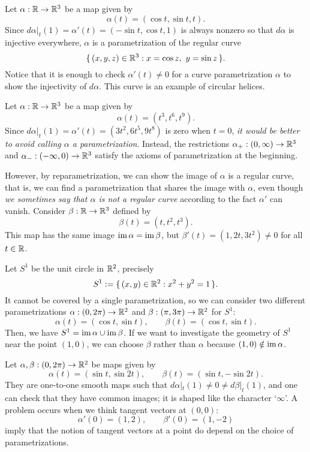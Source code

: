 \documentclass{../../large}
\def\a{\alpha}
\begin{document}
\begin{ex}
\begin{parts}
\item
Let $\a:\R\to\R^3$ be a map given by
\[\a(t)=(\cos t,\sin t, t).\]
Since $d\a|_t(1)=\a'(t)=(-\sin t,\cos t,1)$ is always nonzero so that $d\a$ is injective everywhere, $\a$ is a parametrization of the regular curve
\[\{\,(x,y,z)\in\mathbb{R}^3:x=\cos z,\ y=\sin z\,\}.\]
Notice that it is enough to check $\a'(t)\ne0$ for a curve parametrization $\a$ to show the injectivity of $d\a$.
This curve is an example of circular helices.

\item
Let $\a:\R\to\R^3$ be a map given by
\[\a(t)=(t^3,t^6,t^9).\]
Since $d\a|_t(1)=\a'(t)=(3t^2,6t^5,9t^8)$ is zero when $t=0$, \emph{it would be better to avoid calling $\a$ a parametrization}.
Instead, the restrictions $\a_+:(0,\infty)\to\R^3$ and $\a_-:(-\infty,0)\to\R^3$ satisfy the axioms of parametrization at the beginning.

However, by reparametrization, we can show the image of $\a$ is a regular curve, that is, we can find a parametrization that shares the image with $\a$, even though \emph{we sometimes say that $\a$ is not a regular curve} according to the fact $\a'$ can vanish.
Consider $\beta:\mathbb{R}\to\mathbb{R}^3$ defined by
\[\beta(t)=(t,t^2,t^3).\]
This map has the same image $\im\a=\im\beta$, but $\beta'(t)=(1,2t,3t^2)\ne0$ for all $t\in\mathbb{R}$.

\item
Let $S^1$ be the unit circle in $\mathbb{R}^2$, precisely
\[S^1:=\{\,(x,y)\in\mathbb{R}^2:x^2+y^2=1\,\}.\]
It cannot be covered by a single parametrization, so we can consider two different parametrizations $\a:(0,2\pi)\to\R^2$ and $\beta:(\pi,3\pi)\to\mathbb{R}^2$ for $S^1$:
\[\alpha(t)=(\cos t,\sin t),\qquad\beta(t)=(\cos t,\sin t).\]
Then, we have $S^1=\im\a\cup\im\beta$.
If we want to investigate the geometry of $S^1$ near the point $(1,0)$, we can choose $\beta$ rather than $\a$ because $(1,0)\notin\im\a$.

\item
Let $\a,\beta:(0,2\pi)\to\R^2$ be maps given by
\[\a(t)=(\sin t,\sin2t),\qquad\beta(t)=(\sin t,-\sin2t).\]
They are one-to-one smooth maps such that $d\a|_t(1)\ne0\ne d\beta|_t(1)$, and one can check that they have common images; it is shaped like the character `$\infty$'.
A problem occurs when we think tangent vectors at $(0,0)$:
\[\a'(0)=(1,2),\qquad\beta'(0)=(1,-2)\]
imply that the notion of tangent vectors at a point do depend on the choice of parametrizations.


\end{parts}
\end{ex}
\end{document}
